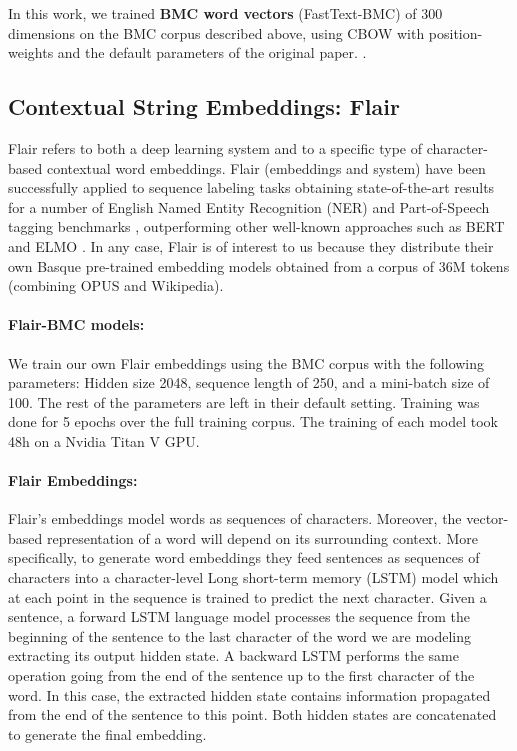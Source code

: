 \documentclass[10pt, a4paper]{article}
\begin{document}
In this work, we trained \textbf{BMC word vectors} (FastText-BMC) of 300 dimensions on the BMC corpus described above, using CBOW with position-weights and the default parameters of the original paper. \cite{fasttext1_bojanowski2017enriching}.

\subsection{Contextual String Embeddings: Flair}\label{sec:build-basq-models:flair}

Flair refers to both a deep learning system and to a specific type of character-based contextual word embeddings. Flair (embeddings and system) have been successfully applied to sequence labeling tasks obtaining state-of-the-art results for a number of English Named Entity Recognition (NER) and Part-of-Speech tagging benchmarks \cite{akbik2018coling}, outperforming other well-known approaches such as BERT and ELMO \cite{devlin2019bert,Peters:2018}. In any case, Flair is of interest to us because they distribute their own Basque pre-trained embedding models obtained from a corpus of 36M tokens (combining OPUS and Wikipedia).

\paragraph{Flair-BMC models:} We train our own Flair embeddings using the BMC corpus with the following parameters: Hidden size 2048, sequence length of 250, and a mini-batch size of 100. The rest of the parameters are left in their default setting. Training was done for 5 epochs over the full training corpus. The training of each model took 48h on a Nvidia Titan V GPU.

\paragraph{Flair Embeddings:} Flair's embeddings model words as sequences of characters. Moreover, the vector-based representation of a word will depend on its surrounding context. More specifically, to generate word embeddings they feed sentences as sequences of characters into a character-level Long short-term memory (LSTM) model which at each point in the sequence is trained to predict the next character. Given a sentence, a forward LSTM language model processes the sequence from the beginning of the sentence to the last character of the word we are modeling extracting its output hidden state. A backward LSTM performs the same operation going from the end of the sentence up to the first character of the word. In this case, the extracted hidden state contains information propagated from the end of the sentence to this point. Both hidden states are concatenated to generate the final embedding.
\end{document}
